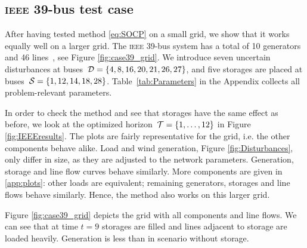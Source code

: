 \documentclass[final,3p,times,twocolumn]{elsarticle}  %
\newcommand{\todo}[1]{\textcolor{orange}{[#1]}}
\begin{document}
\subsection{\textsc{ieee} 39-bus test case}
\label{sec:case39}

After having tested method \eqref{eq:SOCP} on a small grid, we show that it works equally well on a larger grid.
The \textsc{ieee} 39-bus system has a total of 10 generators and 46 lines~\cite{Zimmerman11}, see Figure \ref{fig:case39_grid}.
We introduce seven uncertain disturbances at buses~$\mathcal{\Load} = \{4,8,16,20,21,26,27\}$, and five storages are placed at buses~$\mathcal{\Storage} =  \{1,12,14,18,28\}$.
Table~\ref{tab:Parameters} in the Appendix collects all problem-relevant parameters.

In order to check the method and see that storages have the same effect as before, we look at the optimized horizon~$\mathcal{T} = \{1,\dots,12\}$ in Figure \ref{fig:IEEEresults}. The plots are fairly representative for the grid, i.e. the other components behave alike.
Load and wind generation, Figure \ref{fig:Disturbances}, only differ in size, as they are adjusted to the network parameters.
Generation, storage and line flow curves behave similarly.
More components are given in \ref{app:plots}: other loads are equivalent; remaining generators, storages and line flows behave similarly.
Hence, the method also works on this larger grid.

Figure \ref{fig:case39_grid} depicts the grid with all components and line flows. We can see that at time $t=9$ storages are filled and lines adjacent to storage are loaded heavily. Generation is less than in scenario \caseNoStorage without storage. 




\end{document}
